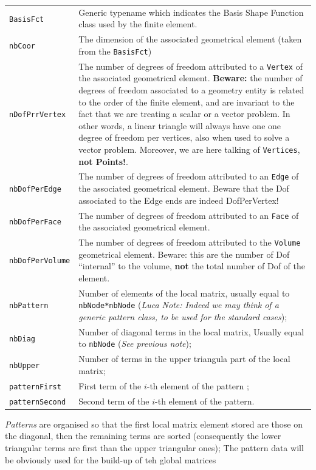 \begin{tabularx}{\textwidth}{lX}
  \hline \texttt{BasisFct} & Generic typename which indicates the
  Basis Shape Function class used by the finite element.\\
  \texttt{nbCoor} & The dimension of the associated geometrical element
  (taken from the \texttt{BasisFct})\\
  \texttt{nDofPrrVertex} & The number of degrees of freedom attributed
  to a \texttt{Vertex} of the associated geometrical element.
  \textbf{Beware:} the number of degrees of freedom associated to a
  geometry entity is related to the order of the finite element, and are
  invariant to the fact that we are treating a scalar or a vector
  problem. In other words, a linear triangle will always have one one
  degree of freedom per vertices, also when used to solve a vector
  problem.
  Moreover, we are here talking of \texttt{Vertices}, \textbf{not Points!}.\\
  \texttt{nbDofPerEdge}& The number of degrees of freedom attributed to
  an \texttt{Edge} of the associated geometrical element. Beware that
  the Dof
  associated to the Edge ends are indeed DofPerVertex!\\
  \texttt{nbDofPerFace}&The number of degrees of freedom attributed to
  an \texttt{Face} of the associated geometrical element.\\
  \texttt{nbDofPerVolume} &The number of degrees of freedom attributed
  to the \texttt{Volume} geometrical element. Beware: this are the
  number of Dof ``internal'' to the volume, \textbf{not} the total
  number of Dof of the element.  \\
\texttt{nbPattern} & Number of elements
  of the local matrix, usually equal to \texttt{nbNode*nbNode}
  (\textsl{Luca Note: Indeed we may think of a
    generic pattern class, to be used for the standard cases});\\
  \texttt{nbDiag} & Number of diagonal terms in the local matrix,
  Usually equal to \texttt{nbNode} (\textsl{See previous note}); \\
  \texttt{nbUpper} & Number of terms in the upper triangula part of the
  local matrix;\\
  \texttt{patternFirst}& First term of the $i$-th element of the pattern ;\\
  \texttt{patternSecond}&Second term of the $i$-th element of the pattern.\\
  \hline
\end{tabularx}

\emph{Patterns} are organised so that the first local matrix element stored are
those on the diagonal, then the remaining terms 
are sorted (consequently the  lower triangular terms are first than the upper triangular ones);
The pattern data will be obviously used for the build-up of teh global matrices


